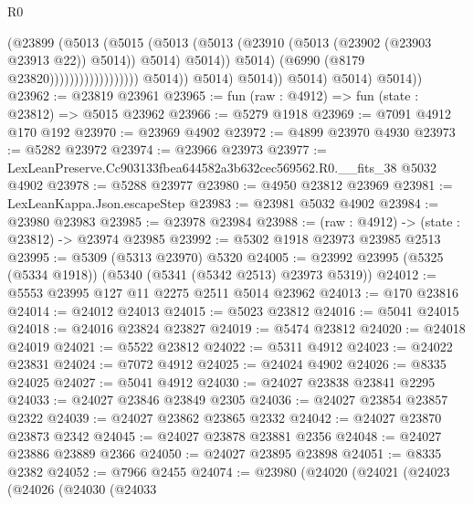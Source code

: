 \begin{lexlean}{R0}
\begin{coremodule}
                                                    (@23899
                                                      (@5013
                                                        (@5015
                                                          (@5013
                                                            (@5013
                                                              (@23910
                                                                (@5013
                                                                  (@23902 (@23903 @23913 @22))
                                                                  @5014))
                                                              @5014)
                                                            @5014))
                                                        @5014)
                                                      (@6990 (@8179 @23820))))))))))))))))))
                      @5014))
                  @5014)
                @5014))
            @5014)
          @5014)
        @5014))
@23962 := @23819 @23961
@23965 := fun (raw : @4912) => fun (state : @23812) => @5015 @23962
@23966 := @5279 @1918
@23969 := @7091 @4912 @170 @192
@23970 := @23969 @4902
@23972 := @4899 @23970 @4930
@23973 := @5282 @23972
@23974 := @23966 @23973
@23977 := LexLeanPreserve.Cc903133fbea644582a3b632cec569562.R0.__fits_38 @5032 @4902
@23978 := @5288 @23977
@23980 := @4950 @23812 @23969
@23981 := LexLeanKappa.Json.escapeStep
@23983 := @23981 @5032 @4902
@23984 := @23980 @23983
@23985 := @23978 @23984
@23988 := (raw : @4912) -> (state : @23812) -> @23974 @23985
@23992 := @5302 @1918 @23973 @23985 @2513
@23995 := @5309 (@5313 @23970) @5320
@24005 := @23992 @23995 (@5325 (@5334 @1918)) (@5340 (@5341 (@5342 @2513) @23973 @5319))
@24012 := @5553 @23995 @127 @11 @2275 @2511 @5014 @23962
@24013 := @170 @23816
@24014 := @24012 @24013
@24015 := @5023 @23812
@24016 := @5041 @24015
@24018 := @24016 @23824 @23827
@24019 := @5474 @23812
@24020 := @24018 @24019
@24021 := @5522 @23812
@24022 := @5311 @4912
@24023 := @24022 @23831
@24024 := @7072 @4912
@24025 := @24024 @4902
@24026 := @8335 @24025
@24027 := @5041 @4912
@24030 := @24027 @23838 @23841 @2295
@24033 := @24027 @23846 @23849 @2305
@24036 := @24027 @23854 @23857 @2322
@24039 := @24027 @23862 @23865 @2332
@24042 := @24027 @23870 @23873 @2342
@24045 := @24027 @23878 @23881 @2356
@24048 := @24027 @23886 @23889 @2366
@24050 := @24027 @23895 @23898
@24051 := @8335 @2382
@24052 := @7966 @2455
@24074 := @23980
    (@24020
      (@24021
        (@24023
          (@24026
            (@24030
              (@24033

\end{coremodule}
\end{lexlean}
